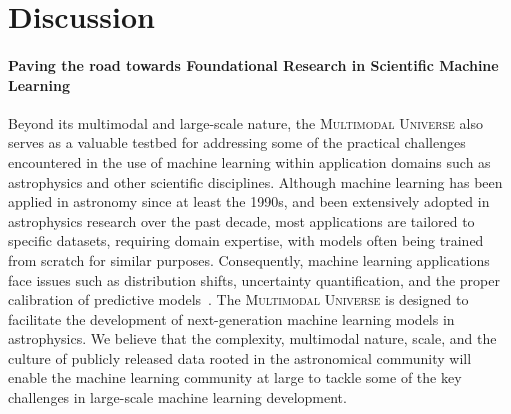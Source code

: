 \documentclass[dvipsnames,table]{article}
\newcommand\pile{\textsc{Multimodal Universe}\xspace}
\newcommand{\FL}[1]{{\color{magenta}FL: #1}}
\begin{document}
\section{Discussion}\label{sec: discussion}

\paragraph{Paving the road towards Foundational Research in Scientific Machine Learning}Beyond its multimodal and large-scale nature, the \pile also serves as a valuable testbed for addressing some of the practical challenges encountered in the use of machine learning within application domains such as astrophysics and other scientific disciplines. Although machine learning has been applied in astronomy since at least the 1990s, and been extensively adopted in astrophysics research over the past decade, most applications are tailored to specific datasets, requiring domain expertise, with models often being trained from scratch for similar purposes. Consequently, machine learning applications face issues such as distribution shifts, uncertainty quantification, and the proper calibration of predictive models~\citep{2023PASA...40....1H}. The \pile is designed to facilitate the development of next-generation machine learning models in astrophysics. We believe that the complexity, multimodal nature, scale, and the culture of publicly released data rooted in the astronomical community will enable the machine learning community at large to tackle some of the key challenges in large-scale machine learning development.


\end{document}
